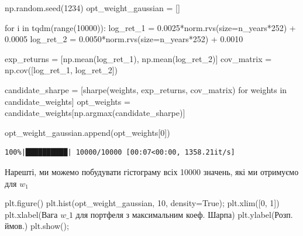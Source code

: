 \documentclass[
  letterpaper,
]{report}
\newenvironment{Shaded}{\begin{snugshade}}{\end{snugshade}}
\newcommand{\BuiltInTok}[1]{\textcolor[rgb]{0.00,0.23,0.31}{#1}}
\newcommand{\ControlFlowTok}[1]{\textcolor[rgb]{0.00,0.23,0.31}{#1}}
\newcommand{\DecValTok}[1]{\textcolor[rgb]{0.68,0.00,0.00}{#1}}
\newcommand{\FloatTok}[1]{\textcolor[rgb]{0.68,0.00,0.00}{#1}}
\newcommand{\KeywordTok}[1]{\textcolor[rgb]{0.00,0.23,0.31}{#1}}
\newcommand{\NormalTok}[1]{\textcolor[rgb]{0.00,0.23,0.31}{#1}}
\newcommand{\OperatorTok}[1]{\textcolor[rgb]{0.37,0.37,0.37}{#1}}
\newcommand{\StringTok}[1]{\textcolor[rgb]{0.13,0.47,0.30}{#1}}
\newcommand{\VariableTok}[1]{\textcolor[rgb]{0.07,0.07,0.07}{#1}}
\begin{document}
\begin{Shaded}
\begin{Highlighting}[]
\NormalTok{np.random.seed(}\DecValTok{1234}\NormalTok{)}
\NormalTok{opt\_weight\_gaussian }\OperatorTok{=}\NormalTok{ []}

\ControlFlowTok{for}\NormalTok{ i }\KeywordTok{in}\NormalTok{ tqdm(}\BuiltInTok{range}\NormalTok{(}\DecValTok{10000}\NormalTok{)):}
\NormalTok{    log\_ret\_1 }\OperatorTok{=} \FloatTok{0.0025}\OperatorTok{*}\NormalTok{norm.rvs(size}\OperatorTok{=}\NormalTok{n\_years}\OperatorTok{*}\DecValTok{252}\NormalTok{) }\OperatorTok{+} \FloatTok{0.0005}
\NormalTok{    log\_ret\_2 }\OperatorTok{=} \FloatTok{0.0050}\OperatorTok{*}\NormalTok{norm.rvs(size}\OperatorTok{=}\NormalTok{n\_years}\OperatorTok{*}\DecValTok{252}\NormalTok{) }\OperatorTok{+} \FloatTok{0.0010}

\NormalTok{    exp\_returns }\OperatorTok{=}\NormalTok{ [np.mean(log\_ret\_1), np.mean(log\_ret\_2)]}
\NormalTok{    cov\_matrix }\OperatorTok{=}\NormalTok{ np.cov([log\_ret\_1, log\_ret\_2])}

\NormalTok{    candidate\_sharpe }\OperatorTok{=}\NormalTok{ [sharpe(weights, exp\_returns, cov\_matrix) }\ControlFlowTok{for}\NormalTok{ weights }\KeywordTok{in}\NormalTok{ candidate\_weights]}
\NormalTok{    opt\_weights }\OperatorTok{=}\NormalTok{ candidate\_weights[np.argmax(candidate\_sharpe)]}

\NormalTok{    opt\_weight\_gaussian.append(opt\_weights[}\DecValTok{0}\NormalTok{])}
\end{Highlighting}
\end{Shaded}

\begin{verbatim}
100%|██████████| 10000/10000 [00:07<00:00, 1358.21it/s]
\end{verbatim}

Нарешті, ми можемо побудувати гістограму всіх 10000 значень, які ми
отримуємо для \(w_1\)

\begin{Shaded}
\begin{Highlighting}[]
\NormalTok{plt.figure()}
\NormalTok{plt.hist(opt\_weight\_gaussian, }\DecValTok{10}\NormalTok{, density}\OperatorTok{=}\VariableTok{True}\NormalTok{)}\OperatorTok{;}
\NormalTok{plt.xlim([}\DecValTok{0}\NormalTok{, }\DecValTok{1}\NormalTok{])}
\NormalTok{plt.xlabel(}\StringTok{\textquotesingle{}Вага $w\_1$ для портфеля з максимальним коеф. Шарпа\textquotesingle{}}\NormalTok{)}
\NormalTok{plt.ylabel(}\StringTok{\textquotesingle{}Розп. ймов.\textquotesingle{}}\NormalTok{)}
\NormalTok{plt.show()}\OperatorTok{;}
\end{Highlighting}
\end{Shaded}
\end{document}
